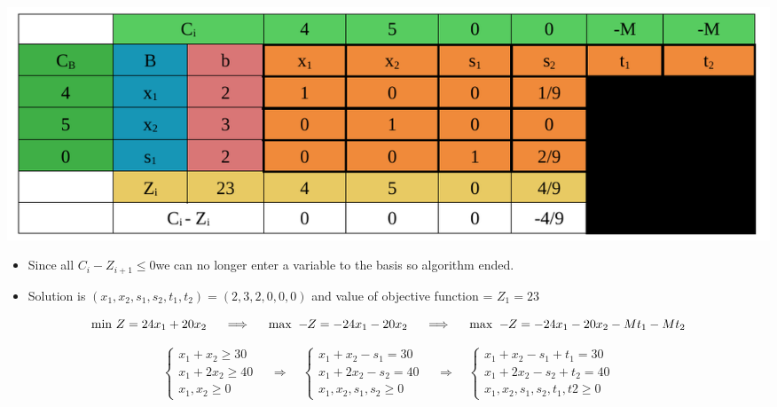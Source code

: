 \vspace{0.25cm}



\begin{center}
    \includegraphics{Chapters/Simplexe/EX/EX2/ex2.7.pdf}
\end{center}

\vspace{0.25cm}

\begin{itemize}
    \item Since all \hspace{0.2cm}\(C_i - Z_{i+1} \leq 0\)\hspace{0.2cm}we can no longer enter a variable to the basis so algorithm ended.
    \item Solution is \((x_1,x_2,s_1,s_2,t_1,t_2) = (2,3,2,0,0,0)\) and value of objective function = \(Z_1 = 23\)
\end{itemize}

\newpage


\[\text{min } Z = 24x_1 + 20x_2 \hspace{0.5cm} \Longrightarrow \hspace{0.5cm} \text{max } -\hspace{-0.1cm}Z = -24x_1 - 20x_2  \hspace{0.5cm} \Longrightarrow \hspace{0.5cm} \text{max } -\hspace{-0.1cm}Z = -24x_1 - 20x_2 - Mt_1 - Mt_2\] 

\[
\left\{
\begin{array}{l}
    x_{1} + x_{2} \geq 30 \\
    x_{1} + 2x_{2} \geq 40 \\
    x_{1}, x_{2} \geq 0
\end{array}
\right.
\quad
\Longrightarrow
\quad
\left\{
\begin{array}{l}
    x_{1} + x_{2} - s_{1} = 30 \\
    x_{1} + 2x_{2} - s_{2} = 40 \\
    x_{1}, x_{2}, s_{1}, s_{2} \geq 0
\end{array}
\right.
\quad
\Longrightarrow
\quad
\left\{
\begin{array}{l}
    x_{1} + x_{2} - s_{1} + t_{1} = 30 \\
    x_{1} + 2x_{2} - s_{2} + t_{2} = 40 \\
    x_{1}, x_{2}, s_{1}, s_{2}, t_{1}, t{2} \geq 0
\end{array}
\right.
\]


